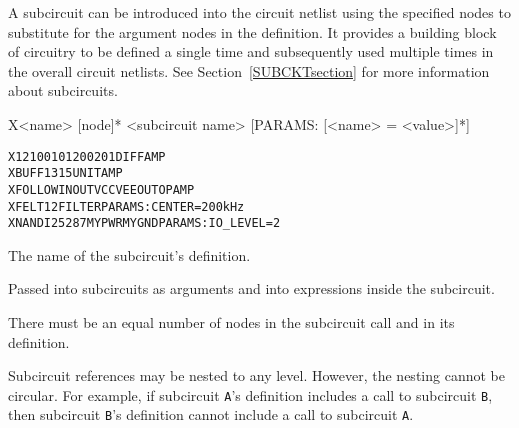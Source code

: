 


\label{XDevicesection}
A subcircuit can be introduced into the circuit netlist
using the specified nodes to substitute for the argument nodes in the
definition.  It provides a building block of circuitry to be defined a single
time and subsequently used multiple times in the overall circuit netlists.
See Section~\ref{SUBCKTsection} for more information about subcircuits.

\begin{Device}

\device
X<name> [node]* <subcircuit name> [PARAMS: [<name> = <value>]*]

\examples
\begin{alltt}
  X12 100 101 200 201 DIFFAMP
  XBUFF 13 15 UNITAMP
  XFOLLOW IN OUT VCC VEE OUT OPAMP
  XFELT 1 2 FILTER PARAMS: CENTER=200kHz
  XNANDI 25 28 7 MYPWR MYGND PARAMS: IO\_LEVEL=2
\end{alltt}

\parameters

\begin{Parameters}

The name of the subcircuit's definition.


Passed into subcircuits as arguments and into expressions inside the
subcircuit.

\end{Parameters}

\comments

There must be an equal number of nodes in the subcircuit call and in its
definition.

Subcircuit references may be nested to any level. However, the nesting
cannot be circular. For example, if subcircuit \texttt{A}'s definition
includes a call to subcircuit \texttt{B}, then subcircuit \texttt{B}'s
definition cannot include a call to subcircuit \texttt{A}.

\end{Device}
